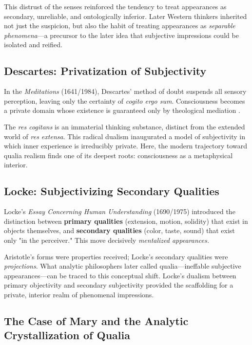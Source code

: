 \documentclass[11pt,a4paper]{article}
\begin{document}
This distrust of the senses reinforced the tendency to treat appearances as secondary, unreliable, and ontologically inferior. Later Western thinkers inherited not just the suspicion, but also the habit of treating appearances as \emph{separable phenomena}—a precursor to the later idea that subjective impressions could be isolated and reified.

\subsection{Descartes: Privatization of Subjectivity}

In the \emph{Meditations} (1641/1984), Descartes' method of doubt suspends all sensory perception, leaving only the certainty of \emph{cogito ergo sum}. Consciousness becomes a private domain whose existence is guaranteed only by theological mediation \cite{cottingham1986, frankfurt1970}.

The \emph{res cogitans} is an immaterial thinking substance, distinct from the extended world of \emph{res extensa}. This radical dualism inaugurated a model of subjectivity in which inner experience is irreducibly private. Here, the modern trajectory toward qualia realism finds one of its deepest roots: consciousness as a metaphysical interior.

\subsection{Locke: Subjectivizing Secondary Qualities}

Locke's \emph{Essay Concerning Human Understanding} (1690/1975) introduced the distinction between \textbf{primary qualities} (extension, motion, solidity) that exist in objects themselves, and \textbf{secondary qualities} (color, taste, sound) that exist only "in the perceiver." This move decisively \emph{mentalized appearances.}

Aristotle's forms were properties received; Locke's secondary qualities were \emph{projections}. What analytic philosophers later called qualia—ineffable subjective appearances—can be traced to this conceptual shift. Locke's dualism between primary objectivity and secondary subjectivity provided the scaffolding for a private, interior realm of phenomenal impressions.

\subsection{The Case of Mary and the Analytic Crystallization of Qualia}
\end{document}
